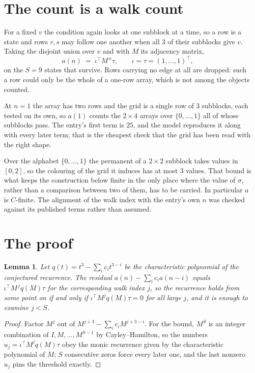 \documentclass[11pt,a4paper]{article}
\theoremstyle{plain}
\newtheorem{lemma}[theorem]{Lemma}
\theoremstyle{definition}
\begin{document}
\section{The count is a walk count}

For a fixed $v$ the condition again looks at one subblock at a time, so a
row is a state and rows $r,s$ may follow one another when all $3$ of their subblocks give
$v$. Taking the disjoint union over $v$ and with $M$ its adjacency matrix,
\[
a(n)\;=\;\iota^{\!\top}M^{\,n}\tau,\qquad\iota=\tau=(1,\dots,1)^{\!\top},
\]
on the $S=9$ states that survive. Rows carrying no edge at all are dropped: such a row could
only be the whole of a one-row array, which is not among the objects counted.

At $n=1$ the array has two rows and the grid is a single row of $3$
subblocks, each tested on its own, so $a(1)$ counts the
$2\times4$ arrays over $\{0,\dots,1\}$ all of whose subblocks pass. The entry's
first term is $25$, and the model reproduces it along with every later term; that is the
cheapest check that the grid has been read with the right shape.

Over the alphabet $\{0,\dots,1\}$ the permanent of a $2\times2$ subblock takes values in
$[0,2]$, so the colouring of the grid it induces has at most $3$ values.
That bound is what keeps the construction below finite in the only place where the value of
$\sigma$, rather than a comparison between two of them, has to be carried.
In particular $a$ is $C$-finite. The alignment of the walk index with the entry's own $n$ was
checked against its published terms rather than assumed.

\section{The proof}

\begin{lemma}\label{lem:crit}
Let $q(t)=t^{3}-\sum_i c_it^{3-i}$ be the characteristic polynomial of the
conjectured recurrence. The residual $a(n)-\sum_ic_ia(n-i)$ equals
$\iota^{\!\top}M^{\,j}q(M)\tau$ for the corresponding walk index $j$, so the recurrence
holds from some point on if and only if $\iota^{\!\top}M^{j}q(M)\tau=0$ for all large $j$,
and it is enough to examine $j<S$.
\end{lemma}

\begin{proof}
Factor $M^{j}$ out of $M^{j+3}-\sum_ic_iM^{j+3-i}$. For the bound, $M^{S}$
is an integer combination of $I,M,\dots,M^{S-1}$ by Cayley--Hamilton, so the numbers
$u_j=\iota^{\!\top}M^{j}q(M)\tau$ obey the monic recurrence given by the characteristic
polynomial of $M$; $S$ consecutive zeros force every later one, and the last nonzero $u_j$
pins the threshold exactly.
\end{proof}
\end{document}
